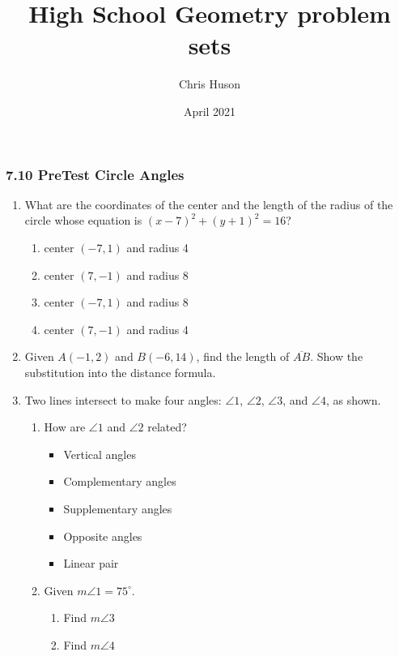 \documentclass[12pt, twoside]{article}
\title{High School Geometry problem sets}
\author{Chris Huson}
\date{April 2021}
\begin{document}
\subsubsection*{7.10 PreTest Circle Angles}
\begin{enumerate}
\item What are the coordinates of the center and the length of the radius of the circle whose equation is $(x-7)^2+(y+1)^2=16$?
  \begin{enumerate}[itemsep=0.25cm]
    \item center $(-7,1)$ and radius 4
    \item center $(7,-1)$ and radius 8
    \item center $(-7,1)$ and radius 8
    \item center $(7,-1)$ and radius 4
  \end{enumerate}

\newpage
\item Given $A(-1,2)$ and $B(-6,14)$, find the length of $\overline{AB}$. Show the substitution into the distance formula.

\newpage
\item Two lines intersect to make four angles: $\angle 1$, $\angle 2$, $\angle 3$, and $\angle 4$, as shown.

  \begin{multicols}{2}  
    \begin{enumerate}
      \item How are $\angle 1$ and $\angle 2$ related?
        \begin{itemize}
          \item Vertical angles
          \item Complementary angles
          \item Supplementary angles
          \item Opposite angles
          \item Linear pair
        \end{itemize}
      \item Given $m\angle 1 = 75^\circ$.
        \begin{enumerate}
          \item Find $m\angle 3$ \vspace{0.5cm}
          \item Find $m\angle 4$ \vspace{2cm}
        \end{enumerate} 
        \end{enumerate}
  \end{multicols}
  

\end{enumerate}
\end{document}
